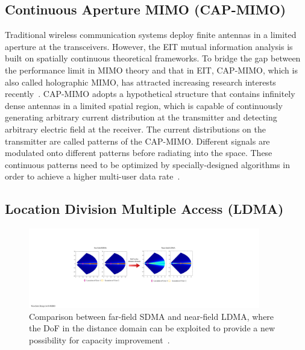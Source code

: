 \documentclass[journal,twocolumn]{IEEEtran}
\begin{document}
\subsection{Continuous Aperture MIMO (CAP-MIMO)}
Traditional wireless communication systems deploy finite antennas in a limited aperture at the transceivers. 
However, the EIT mutual information analysis is built on spatially continuous theoretical frameworks. 
To bridge the gap between the performance limit in MIMO theory and that in EIT, CAP-MIMO, which is also called holographic MIMO, has attracted increasing research interests recently~\cite{zhang2022pdma}. 
CAP-MIMO adopts a hypothetical structure that contains infinitely dense antennas in a limited spatial region, which is capable of continuously generating arbitrary current distribution at the transmitter and detecting arbitrary electric field at the receiver.  
The current distributions on the transmitter are called patterns of the CAP-MIMO. 
Different signals are modulated onto different patterns before radiating into the space. 
These continuous patterns need to be optimized by specially-designed algorithms in order to achieve a higher multi-user data rate~\cite{zhang2022pdma}. 



\subsection{Location Division Multiple Access (LDMA)}
\begin{figure}[t]
	\centering 
	\includegraphics[width=0.9\textwidth]{figures/LDMA.pdf} 
	\caption{Comparison between far-field SDMA and near-field LDMA, where the DoF in the distance domain can be exploited to provide a new possibility for capacity improvement~\cite{wu2022multiple}. }
	\label{fig:LDMA}
\end{figure}
\end{document}
